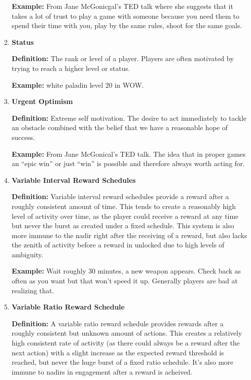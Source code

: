 \begin{enumerate}
\textbf{Example:} From Jane McGonicgal’s TED talk where she suggests that it takes a lot of trust to play a game with someone because you need them to spend their time with you, play by the same rules, shoot for the same goals.

\item \textbf{Status}

\textbf{Definition:} The rank or level of a player. Players are often motivated by trying to reach a higher level or status.

\textbf{Example:} white paladin level 20 in WOW.

\item \textbf{Urgent Optimism}

\textbf{Definition:} Extreme self motivation. The desire to act immediately to tackle an obstacle combined with the belief that we have a reasonable hope of success.

\textbf{Example:} From Jane McGonical’s TED talk. The idea that in proper games an ``epic win'' or just ``win'' is possible and therefore always worth acting for.

\item \textbf{Variable Interval Reward Schedules}

\textbf{Definition:} Variable interval reward schedules provide a reward after a roughly consistent amount of time. This tends to create a reasonably high level of activity over time, as the player could receive a reward at any time but never the burst as created under a fixed schedule. This system is also more immune to the nadir right after the receiving of a reward, but also lacks the zenith of activity before a reward in unlocked due to high levels of ambiguity.

\textbf{Example:} Wait roughly 30 minutes, a new weapon appears. Check back as often as you want but that won’t speed it up. Generally players are bad at realizing that.

\item \textbf{Variable Ratio Reward Schedule}

\textbf{Definition:} A variable ratio reward schedule provides rewards after a roughly consistent but unknown amount of actions. This creates a relatively high consistent rate of activity (as there could always be a reward after the next action) with a slight increase as the expected reward threshold is reached, but never the huge burst of a fixed ratio schedule. It’s also more immune to nadirs in engagement after a reward is acheived.


\end{enumerate}
